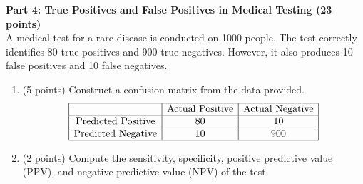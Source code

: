 \documentclass[a3paper,12pt]{extarticle} %
\begin{document}
    \subitem \textbf{Part 4: True Positives and False Positives in Medical Testing (23 points)}
    \\ A medical test for a rare disease is conducted on 1000 people. The test correctly identifies 80 true positives and 900 true negatives. However, it also produces 10 false positives and 10 false negatives.
    \begin{enumerate}
        \item (5 points) Construct a confusion matrix from the data provided.
        \[
        \begin{array}{|c|c|c|}
        \hline
        & \text{Actual Positive} & \text{Actual Negative} \\
        \hline
        \text{Predicted Positive} & 80 & 10 \\
        \hline
        \text{Predicted Negative} & 10 & 900 \\
        \hline
        \end{array}
        \]
        \item (2 points) Compute the sensitivity, specificity, positive predictive value (PPV), and negative
        predictive value (NPV) of the test.
    \end{enumerate}
\end{document}
